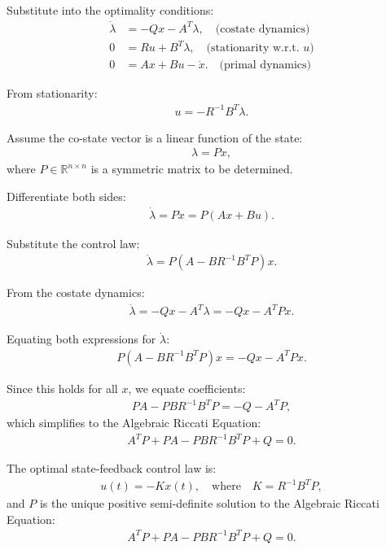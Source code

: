 Substitute into the optimality conditions:
\begin{align*}
\dot{\lambda} &= -Qx - A^T \lambda, \quad \text{(costate dynamics)} \\
0 &= R u + B^T \lambda, \quad \text{(stationarity w.r.t. } u) \\
0 &= Ax + Bu - \dot{x}. \quad \text{(primal dynamics)}
\end{align*}

\hrulefill

From stationarity:
\begin{align*}
u = -R^{-1} B^T \lambda.
\end{align*}

Assume the co-state vector is a linear function of the state:
\begin{align*}
\lambda = P x,
\end{align*}
where \( P \in \mathbb{R}^{n \times n} \) is a symmetric matrix to be determined.

Differentiate both sides:
\begin{align*}
\dot{\lambda} = P \dot{x} = P(Ax + Bu).
\end{align*}

Substitute the control law:
\begin{align*}
\dot{\lambda} = P (A - B R^{-1} B^T P) x.
\end{align*}

From the costate dynamics:
\begin{align*}
\dot{\lambda} = -Q x - A^T \lambda = -Q x - A^T P x.
\end{align*}

Equating both expressions for $\dot{\lambda}$:
\begin{align*}
P (A - B R^{-1} B^T P) x = -Q x - A^T P x.
\end{align*}

Since this holds for all $x$, we equate coefficients:
\begin{align*}
P A - P B R^{-1} B^T P = -Q - A^T P,
\end{align*}
which simplifies to the Algebraic Riccati Equation:
\begin{align*}
A^T P + P A - P B R^{-1} B^T P + Q = 0.
\end{align*}

\hrulefill

The optimal state-feedback control law is:
\begin{align*}
u(t) = -K x(t), \quad \text{where} \quad K = R^{-1} B^T P,
\end{align*}
and \( P \) is the unique positive semi-definite solution to the Algebraic Riccati Equation:
\begin{align*}
A^T P + P A - P B R^{-1} B^T P + Q = 0.
\end{align*}
\hrulefill

